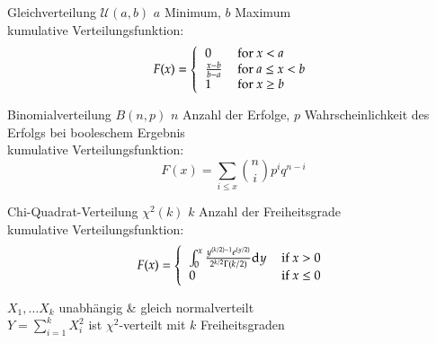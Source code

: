 \documentclass{beamer}
\begin{document}
\begin{frame}{\insertsection}
\begin{block}{Gleichverteilung $\mathcal{U}(a,b)$}
	$a$ Minimum, $b$ Maximum \\
	kumulative Verteilungsfunktion:
	\begin{equation*}
	F(x) = \left\{\begin{tabular}{ll}
	0 & for $x<a$ \\
	$\frac{x-b}{b-a}$ & for $a\leq x<b$ \\
	1 & for $x\geq b$ \\
	\end{tabular}\right.
	\end{equation*}
\end{block}
\end{frame}

\begin{frame}{\insertsection}
\begin{block}{Binomialverteilung $B(n,p)$}
	$n$ Anzahl der Erfolge, $p$ Wahrscheinlichkeit des Erfolgs bei booleschem Ergebnis \\
	kumulative Verteilungsfunktion:
	\begin{equation*}
	F(x) = \sum_{i\leq x} \genfrac(){0pt}{}{n}{i} p^{i}q^{n-i}
	\end{equation*}
\end{block}
\end{frame}


\begin{frame}{\insertsection}
\begin{block}{Chi-Quadrat-Verteilung $\chi^2(k)$}
	$k$ Anzahl der Freiheitsgrade \\
	kumulative Verteilungsfunktion:
	\begin{equation*}
	F(x) = \left\{\begin{tabular}{ll}
	$\int_{0}^{x} \frac{y^{(k/2)-1}e^{(y/2)}}{2^{k/2}\Gamma(k/2)}\textrm{d}y$ & if $x>0$ \\
	0 & if $x\leq 0$
	\end{tabular}\right.
	\end{equation*}
\end{block}
\begin{example}
	$X_1, \ldots X_k$ unabhängig \& gleich normalverteilt \\
	$Y = \sum_{i=1}^{k}X_i^2$ ist $\chi^2$-verteilt mit $k$ Freiheitsgraden
\end{example}
\end{frame}


\end{document}
